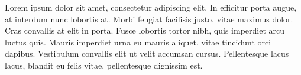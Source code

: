 \documentclass[12pt]{report}
\begin{document}
%
%
\titlepage
\comemberspage
\firstabstract
%
\toc
\newpage
\listoffigures
\listoftables
%
\newpage
{}






%
%
%
\acknowledgements
Lorem ipsum dolor sit amet, consectetur adipiscing elit. In efficitur porta augue, at interdum nunc lobortis at. Morbi feugiat facilisis justo, vitae maximus dolor. Cras convallis at elit in porta. Fusce lobortis tortor nibh, quis imperdiet arcu luctus quis. Mauris imperdiet urna eu mauris aliquet, vitae tincidunt orci dapibus. Vestibulum convallis elit ut velit accumsan cursus. Pellentesque lacus lacus, blandit eu felis vitae, pellentesque dignissim est.
%
%
%
\newpage
\nocite{*}

%






%

%
\appendix

\end{document}
